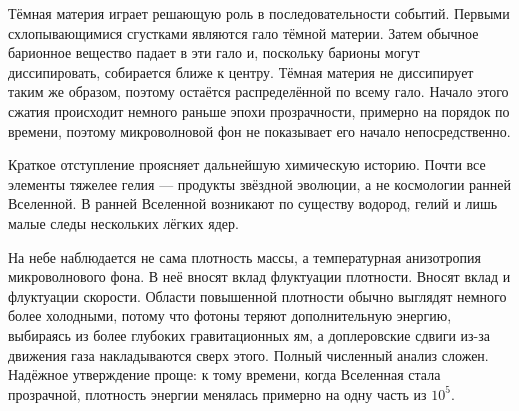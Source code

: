 Тёмная материя играет решающую роль в последовательности событий. Первыми схлопывающимися сгустками являются гало тёмной материи. Затем обычное барионное вещество падает в эти гало и, поскольку барионы могут диссипировать, собирается ближе к центру. Тёмная материя не диссипирует таким же образом, поэтому остаётся распределённой по всему гало. Начало этого сжатия происходит немного раньше эпохи прозрачности, примерно на порядок по времени, поэтому микроволновой фон не показывает его начало непосредственно.

Краткое отступление проясняет дальнейшую химическую историю. Почти все элементы тяжелее гелия — продукты звёздной эволюции, а не космологии ранней Вселенной. В ранней Вселенной возникают по существу водород, гелий и лишь малые следы нескольких лёгких ядер.

На небе наблюдается не сама плотность массы, а температурная анизотропия микроволнового фона. В неё вносят вклад флуктуации плотности. Вносят вклад и флуктуации скорости. Области повышенной плотности обычно выглядят немного более холодными, потому что фотоны теряют дополнительную энергию, выбираясь из более глубоких гравитационных ям, а доплеровские сдвиги из-за движения газа накладываются сверх этого. Полный численный анализ сложен. Надёжное утверждение проще: к тому времени, когда Вселенная стала прозрачной, плотность энергии менялась примерно на одну часть из \(10^5\).

\begin{classroomqa}
\end{classroomqa}

\begin{classroomqa}
\end{classroomqa}

\begin{classroomqa}
\end{classroomqa}

